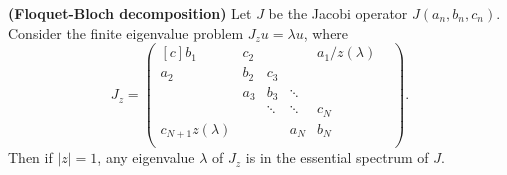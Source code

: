 \documentclass[../main.tex]{subfiles}
\begin{document}
\begin{proposition}{\textbf{(Floquet-Bloch decomposition)}}
  Let $J$ be the Jacobi operator $J(a_n, b_n, c_n)$. 
  Consider the finite eigenvalue problem $J_z u = \lambda u$, where
  \begin{equation}
  \label{eqn:floquet-bloch}
    J_z =
    \begin{pmatrix*}[c]
      b_1 & c_2 & & & a_1/z(\lambda)\\
      a_2 & b_2 & c_3 & & & \\
      & a_3 & b_3 & \ddots & & \\
      & & \ddots & \ddots & c_N & \\
      c_{N+1} z(\lambda) & & & a_N & b_N\\
    \end{pmatrix*}.
  \end{equation}
Then if $|z|=1$, any eigenvalue $\lambda$ of $J_z$
is in the essential spectrum of $J$.
\end{proposition}
\end{document}

